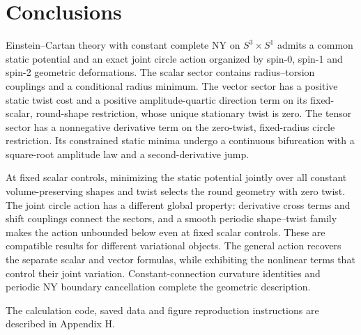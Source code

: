 \section{Conclusions}

\label{sec:8}

Einstein--Cartan theory with constant complete NY on $S^3\times S^1$ admits a common static potential and an exact joint circle action organized by spin-0, spin-1 and spin-2 geometric deformations. The scalar sector contains radius--torsion couplings and a conditional radius minimum. The vector sector has a positive static twist cost and a positive amplitude-quartic direction term on its fixed-scalar, round-shape restriction, whose unique stationary twist is zero. The tensor sector has a nonnegative derivative term on the zero-twist, fixed-radius circle restriction. Its constrained static minima undergo a continuous bifurcation with a square-root amplitude law and a second-derivative jump.

At fixed scalar controls, minimizing the static potential jointly over all constant volume-preserving shapes and twist selects the round geometry with zero twist. The joint circle action has a different global property: derivative cross terms and shift couplings connect the sectors, and a smooth periodic shape--twist family makes the action unbounded below even at fixed scalar controls. These are compatible results for different variational objects. The general action recovers the separate scalar and vector formulas, while exhibiting the nonlinear terms that control their joint variation. Constant-connection curvature identities and periodic NY boundary cancellation complete the geometric description.

The calculation code, saved data and figure reproduction instructions are described in Appendix H.